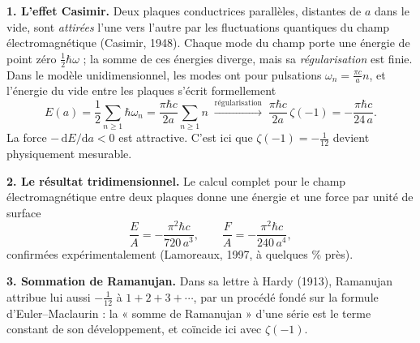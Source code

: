 \decsep{}



\begin{mdframed}[style=exbar]
  \textbf{1. L'effet Casimir.}\enspace{}%
  Deux plaques conductrices parallèles, distantes de $a$ dans le vide, sont
  \emph{attirées} l'une vers l'autre par les fluctuations quantiques du champ
  électromagnétique (Casimir, 1948). Chaque mode du champ porte une énergie de
  point zéro $\tfrac12\hbar\omega$ ; la somme de ces énergies diverge, mais sa
  \emph{régularisation} est finie. Dans le modèle unidimensionnel, les modes ont
  pour pulsations $\omega_n=\tfrac{\pi c}{a}n$, et l'énergie du vide entre les
  plaques s'écrit formellement
  \[
    E(a)=\frac{1}{2}\sum_{n\geq 1}\hbar\omega_n
        =\frac{\pi\hbar c}{2a}\sum_{n\geq 1} n
        \;\xrightarrow{\text{régularisation}}\;
        \frac{\pi\hbar c}{2a}\,\zeta(-1)=-\frac{\pi\hbar c}{24\,a}.
  \]
  La force $-\,\mathrm{d}E/\mathrm{d}a<0$ est attractive. C'est ici que
  $\zeta(-1)=-\tfrac1{12}$ devient physiquement mesurable.

  \smallskip\noindent
  \textbf{2. Le résultat tridimensionnel.}\enspace%
  Le calcul complet pour le champ électromagnétique entre deux plaques donne une
  énergie et une force par unité de surface
  \[
    \frac{E}{A}=-\frac{\pi^{2}\hbar c}{720\,a^{3}},\qquad
    \frac{F}{A}=-\frac{\pi^{2}\hbar c}{240\,a^{4}},
  \]
  confirmées expérimentalement (Lamoreaux, 1997, à quelques \% près).

  \smallskip\noindent
  \textbf{3. Sommation de Ramanujan.}\enspace{}%
  Dans sa lettre à Hardy (1913), Ramanujan attribue lui aussi $-\tfrac1{12}$ à
  $1+2+3+\cdots$, par un procédé fondé sur la formule d'Euler--Maclaurin : la
  « somme de Ramanujan » d'une série est le terme constant de son développement,
  et coïncide ici avec $\zeta(-1)$.
\end{mdframed}

\vspace{6pt}

